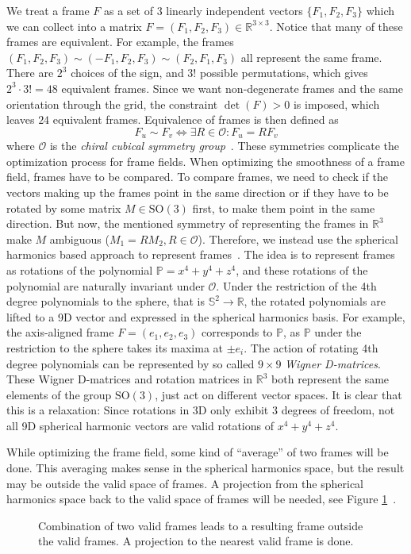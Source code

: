 \documentclass[../thesis.tex]{subfiles}
\begin{document}
We treat a frame $F$ as a set of 3 linearly independent vectors $\{F_1,F_2,F_3 \}$ which we can
collect into a matrix $F=(F_1,F_2,F_3) \in \mathbb{R}^{3\times 3}$.
Notice that many of these frames are equivalent. For example, the frames $(F_1, F_2, F_3) \sim (-F_1, F_2, F_3) \sim (F_2, F_1, F_3)$
all represent the same frame.
There are $2^3$ choices of the sign, and $3!$ possible permutations, which
gives $2^3\cdot 3! = 48$ equivalent frames.
Since we want non-degenerate frames and the same orientation through the grid, the constraint $\det(F)>0$ is imposed,
which leaves $24$ equivalent frames.
Equivalence of frames is then defined as
$$F_u \sim F_v \iff \exists R \in \mathcal{O} : F_u=RF_v$$
where $\mathcal{O}$ is the \emph{chiral cubical symmetry group}~\cite{Nieser}.
These symmetries complicate the optimization process for frame fields.
When optimizing the smoothness of a frame field, frames have to be compared.
To compare frames, we need to check if the vectors making up
the frames point in the same direction or if they have to be rotated
by some matrix $M \in \mathrm{SO}(3)$ first, to make them point in the same direction.
But now, the mentioned symmetry of representing the frames in $\mathbb{R}^3$
make $M$ ambiguous (${M_1 = RM_2, R \in \mathcal{O}}$).
Therefore, we instead use the spherical harmonics based approach to represent frames~\cite{Huang}.
The idea is to represent frames as rotations of the polynomial $\mathbb{P}=x^4+y^4+z^4$,
and these rotations of the polynomial are naturally invariant under $\mathcal{O}$.
Under the restriction of the 4th degree polynomials to the sphere, that is $\mathbb{S}^2\to \mathbb{R}$,
the rotated polynomials are lifted to a 9D vector and expressed in the spherical harmonics basis.
For example, the axis-aligned frame $F=(e_1,e_2,e_3)$ corresponds
to $\mathbb{P}$, as $\mathbb{P}$ under the restriction to the sphere takes its maxima at $\pm e_i$.
The action of rotating 4th degree polynomials can be represented by so called $9\times9$ \emph{Wigner D-matrices}.
These Wigner D-matrices and rotation matrices in $\mathbb{R}^3$ both represent the
same elements of the group $\mathrm{SO}(3)$, just act on different vector spaces.
It is clear that this is a relaxation: Since rotations in 3D only exhibit 3 degrees of freedom, not all 9D spherical harmonic vectors are valid rotations
of $x^4+y^4+z^4$.

While optimizing the frame field, some kind of ``average'' of two frames will be done.
This averaging makes sense in the spherical harmonics space, but the result may be outside the valid
space of frames. A projection from the spherical
harmonics space back to the valid space of frames will be needed, see Figure \ref{fig:projection}~\cite{Ray}.
\begin{figure}[htb]
  \centering
  \def\svgwidth{30em}
  
  \caption{Combination of two valid frames leads to a resulting frame outside the valid frames. A projection to the nearest valid frame is done.}
  \label{fig:projection}
\end{figure}
\end{document}
